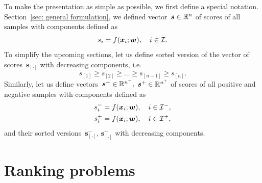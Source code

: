 To make the presentation as simple as possible, we first define a special notation. Section~\ref{sec: general formulation}, we defined vector~$\bm{s} \in \mathbb{R}^n$ of scores of all samples with components defined as
\begin{equation}\label{eq: scores}
  s_i = f(\bm{x}_i; \bm{w}), \quad i \in \mathcal{I}.
\end{equation}
To simplify the upcoming sections, let us define sorted version of the vector of scores~$\bm{s}_{[\cdot]}$ with decreasing components, i.e.
\begin{equation*}
  s_{[1]}   \ge s_{[2]} \ge \dots \ge s_{[n - 1]} \ge s_{[n]}.
\end{equation*}
Similarly, let us define vectors~$\bm{s}^- \in \mathbb{R}^{n^-},$ $\bm{s}^+ \in \mathbb{R}^{n^+}$ of scores of all positive and negative samples with components defined as
\begin{equation}\label{eq: scores neg/pos}
  \begin{aligned}
    s^-_i & = f(\bm{x}_i; \bm{w}), \quad i \in \mathcal{I}^-, \\
    s^+_i & = f(\bm{x}_i; \bm{w}), \quad i \in \mathcal{I}^+,
  \end{aligned}
\end{equation}
and their sorted versions~$\bm{s}^-_{[\cdot]}$, $\bm{s}^+_{[\cdot]}$ with decreasing components.

\section{Ranking problems}\label{sec:obj1}

